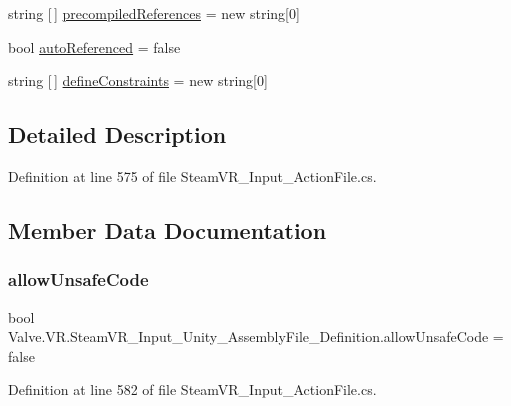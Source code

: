 \begin{DoxyCompactItemize}
string \mbox{[}$\,$\mbox{]} \mbox{\hyperlink{class_valve_1_1_v_r_1_1_steam_v_r___input___unity___assembly_file___definition_a00a56504ee9cec41fd53c143b285dee5}{precompiled\+References}} = new string\mbox{[}0\mbox{]}
\item 
bool \mbox{\hyperlink{class_valve_1_1_v_r_1_1_steam_v_r___input___unity___assembly_file___definition_aef23b93ad724aee182c3f4f74fb8dbee}{auto\+Referenced}} = false
\item 
string \mbox{[}$\,$\mbox{]} \mbox{\hyperlink{class_valve_1_1_v_r_1_1_steam_v_r___input___unity___assembly_file___definition_a72d3ab4ebf69cd107c1dea171b37d998}{define\+Constraints}} = new string\mbox{[}0\mbox{]}
\end{DoxyCompactItemize}


\subsection{Detailed Description}


Definition at line 575 of file Steam\+V\+R\+\_\+\+Input\+\_\+\+Action\+File.\+cs.



\subsection{Member Data Documentation}
\mbox{\label{class_valve_1_1_v_r_1_1_steam_v_r___input___unity___assembly_file___definition_a4d0c04e358771b9d787a75806925912c}} 
\subsubsection{\texorpdfstring{allowUnsafeCode}{allowUnsafeCode}}
{\footnotesize\ttfamily bool Valve.\+V\+R.\+Steam\+V\+R\+\_\+\+Input\+\_\+\+Unity\+\_\+\+Assembly\+File\+\_\+\+Definition.\+allow\+Unsafe\+Code = false}



Definition at line 582 of file Steam\+V\+R\+\_\+\+Input\+\_\+\+Action\+File.\+cs.

\mbox{\label{class_valve_1_1_v_r_1_1_steam_v_r___input___unity___assembly_file___definition_aef23b93ad724aee182c3f4f74fb8dbee}} 
